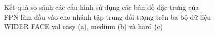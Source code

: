 {    \begin{figure}[H]
        \centering
        \caption{Kết quả so sánh các cấu hình sử dụng các bản đồ đặc trưng của FPN làm đầu vào cho nhánh tập trung đối tượng trên ba bộ dữ liệu WIDER FACE val easy (a), medium (b) và hard (c)}
        \label{fig:retinafocus_widerface_val_fpn}
    \end{figure}

}
